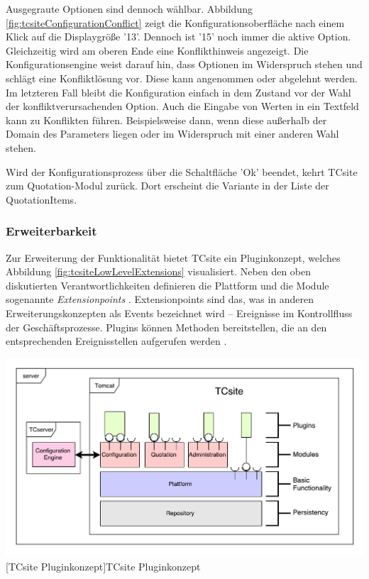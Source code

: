 \documentclass[11pt, a4paper, titlepage, listof=totoc, bibliography=totoc, index=totoc, twoside, openright, headings=normal]{scrreprt}
\begin{document}
Ausgegraute Optionen sind dennoch wählbar. Abbildung \ref{fig:tcsiteConfigurationConflict} zeigt die Konfigurationsoberfläche nach einem Klick auf die Displaygröße '13'. Dennoch ist '15' noch immer die aktive Option. Gleichzeitig wird am oberen Ende eine Konflikthinweis angezeigt. Die Konfigurationsengine weist darauf hin, dass Optionen im Widerspruch stehen und schlägt eine Konfliktlösung vor. Diese kann angenommen oder abgelehnt werden. Im letzteren Fall bleibt die Konfiguration einfach in dem Zustand vor der Wahl der konfliktverursachenden Option. Auch die Eingabe von Werten in ein Textfeld kann zu Konflikten führen. Beispielsweise dann, wenn diese außerhalb der Domain des Parameters liegen oder im Widerspruch mit einer anderen Wahl stehen. 

Wird der Konfigurationsprozess über die Schaltfläche 'Ok' beendet, kehrt TCsite zum Quotation-Modul zurück. Dort erscheint die Variante in der Liste der QuotationItems.

\subsubsection{Erweiterbarkeit}
\label{TCsiteErweiterbarkeit}

Zur Erweiterung der Funktionalität bietet TCsite ein Pluginkonzept, welches Abbildung \ref{fig:tcsiteLowLevelExtensions} visualisiert. Neben den oben diskutierten Verantwortlichkeiten definieren die Plattform und die Module sogenannte \emph{Extensionpoints} \citep{tactonTCsiteApiDocu}. Extensionpoints sind das, was in anderen Erweiterungskonzepten als Events bezeichnet wird -- Ereignisse im Kontrollfluss der Geschäftsprozesse. Plugins können Methoden bereitstellen, die an den entsprechenden Ereignisstellen aufgerufen werden  \citep{tactonTCsiteDevelopmentManual}.

\vspace{1em}
\begin{minipage}{\linewidth}
	\centering
	\includegraphics[width=0.8\linewidth]{Abbildungen/tcsiteLowLevelExtensions.pdf}
	[TCsite Pluginkonzept]{TCsite Pluginkonzept}
	\label{fig:tcsiteLowLevelExtensions}
\end{minipage}
\vspace{0.3em}
\end{document}
